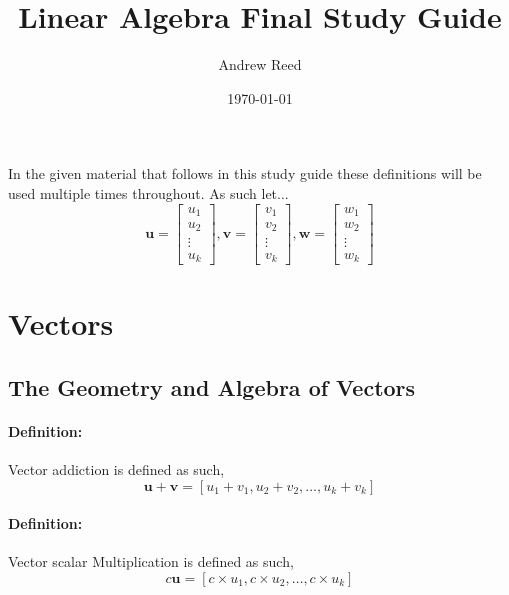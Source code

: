 \documentclass[12pt]{article}
\title{Linear Algebra Final Study Guide}
\author{Andrew Reed}
\date{\today}
\newenvironment{definition}{\paragraph{Definition: }}{\hfill}
\begin{document}
\maketitle

In the given material that follows in this study guide these definitions will be used multiple times throughout. As such let...
\[
\textbf{u} = 
\begin{bmatrix}
	u_{1}\\
	u_{2}\\
	\vdots \\
	u_{k}
\end{bmatrix}
,
\textbf{v} = 
\begin{bmatrix}
v_{1}\\
v_{2}\\
\vdots \\
v_{k}
\end{bmatrix}
,
\textbf{w} = 
\begin{bmatrix}
w_{1}\\
w_{2}\\
\vdots \\
w_{k}
\end{bmatrix}
\]

\newpage

\section{Vectors}
\subsection{The Geometry and Algebra of Vectors}

\begin{definition}
	Vector addiction is defined as such,
	\[
		\textbf{u} + \textbf{v} = [u_1 + v_1, u_2 + v_2, \dots, u_k + v_k]
	\]
\end{definition}

\begin{definition}
	Vector scalar Multiplication is defined as such, 
	\[
		c\textbf{u} = [c \times u_1, c \times u_2, \dots, c \times u_k]
	\]
\end{definition}
\end{document}
